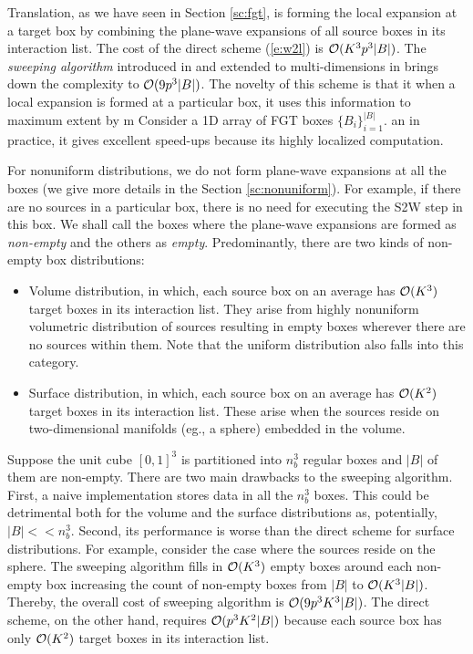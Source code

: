 Translation, as we have seen in Section \ref{sc:fgt}, is forming the local expansion at a target box by combining the plane-wave expansions of all source boxes in its interaction list.  The cost of the direct scheme (\ref{e:w2l}) is $\mathcal{O}(K^3 p^3 |B|)$. The {\em sweeping algorithm} introduced in \cite{greengard98} and extended to multi-dimensions in \cite{fggt} brings down the complexity to $\mathcal{O}(9p^3 |B|)$. The novelty of this scheme is that it when a local expansion is formed at a particular box, it uses this information to maximum extent by m
Consider a 1D array of FGT boxes $\{B_i\}_{i=1}^{|B|}$. 
an in practice, it gives excellent speed-ups because its highly localized computation. 


For nonuniform distributions, we do not form plane-wave expansions at all the boxes (we give more details in the Section \ref{sc:nonuniform}). For example, if there are no sources in a particular box, there is no need for executing the S2W step in this box. We shall call the boxes where the plane-wave expansions are formed as {\em non-empty} and the others as {\em empty}. Predominantly, there are two kinds of non-empty box distributions:
%
\begin{itemize}
 \item Volume distribution, in which, each source box on an average has $\mathcal{O}(K^3)$ target boxes in its interaction list.  They arise from highly nonuniform volumetric distribution of sources resulting in empty boxes wherever there are no sources within them. Note that the uniform distribution also falls into this category.
 
 \item Surface distribution, in which, each source box on an average has $\mathcal{O}(K^2)$ target boxes in its interaction list. These arise when the sources reside on two-dimensional manifolds (eg., a sphere) embedded in the volume. 
\end{itemize}

Suppose the unit cube $[0, 1]^3$ is partitioned into $n_b^3$ regular boxes and $|B|$ of them are non-empty. There are two main drawbacks to the sweeping algorithm. First, a naive implementation stores data in all the $n_b^3$ boxes. This could be detrimental both for the volume and the surface distributions as, potentially, $|B| <\!< n_b^3$. Second, its performance is worse than the direct scheme for surface distributions. For example, consider the case where the sources reside on the sphere. The sweeping algorithm fills in $\mathcal{O}(K^3)$ empty boxes around each non-empty box increasing the count of non-empty boxes from $|B|$ to $\mathcal{O}(K^3 |B|)$. Thereby, the overall cost of sweeping algorithm is $\mathcal{O}(9 p^3 K^3 |B|)$. The direct scheme, on the other hand, requires $\mathcal{O}(p^3 K^2 |B|)$ because each source box has only $\mathcal{O}(K^2)$ target boxes in its interaction list. 

